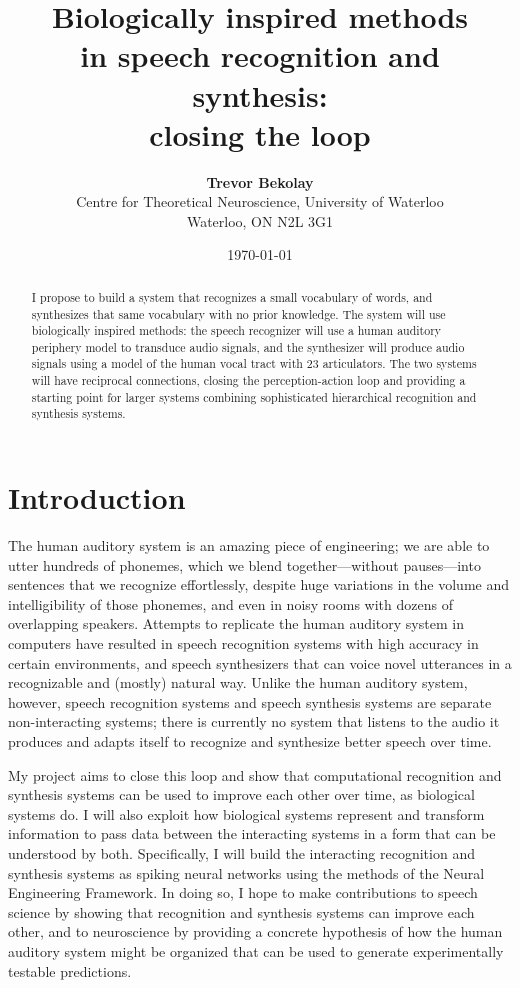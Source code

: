 \documentclass{article}
\title{\bf Biologically inspired methods \\
  in speech recognition and synthesis: \\
  closing the loop}
\date{\today}
\author{{\bf Trevor Bekolay} \\
  Centre for Theoretical Neuroscience, University of Waterloo \\
  Waterloo, ON  N2L 3G1}
\begin{document}
\maketitle

\begin{abstract}
  I propose to build a system that recognizes
  a small vocabulary of words,
  and synthesizes that same vocabulary
  with no prior knowledge.
  The system will use biologically inspired methods:
  the speech recognizer will use a
  human auditory periphery model
  to transduce audio signals,
  and the synthesizer will
  produce audio signals
  using a model of the human vocal tract
  with 23 articulators.
  The two systems will have
  reciprocal connections,
  closing the perception-action loop
  and providing a starting point for
  larger systems combining
  sophisticated hierarchical
  recognition and synthesis systems.
\end{abstract}

\section{Introduction}
\label{sec:intro}

The human auditory system is an
amazing piece of engineering;
we are able to utter hundreds of phonemes,
which we blend together---without pauses---into
sentences that we recognize effortlessly,
despite huge variations in the
volume and intelligibility of
those phonemes,
and even in noisy rooms with
dozens of overlapping speakers.
Attempts to replicate the human auditory system
in computers have resulted in
speech recognition systems with
high accuracy in certain environments,
and speech synthesizers that
can voice novel utterances
in a recognizable and
(mostly) natural way.
Unlike the human auditory system, however,
speech recognition systems
and speech synthesis systems
are separate non-interacting systems;
there is currently no system
that listens to the audio it produces
and adapts itself to recognize
and synthesize better speech over time.

My project aims to close this loop
and show that computational
recognition and synthesis systems
can be used to improve each other over time,
as biological systems do.
I will also exploit how biological systems
represent and transform information
to pass data between the interacting systems
in a form that can be understood by both.
Specifically, I will build the interacting
recognition and synthesis systems
as spiking neural networks using the
methods of the Neural Engineering Framework.
In doing so, I hope to make contributions
to speech science by showing that
recognition and synthesis systems
can improve each other,
and to neuroscience by providing
a concrete hypothesis of how
the human auditory system
might be organized
that can be used to generate
experimentally testable predictions.
\end{document}

